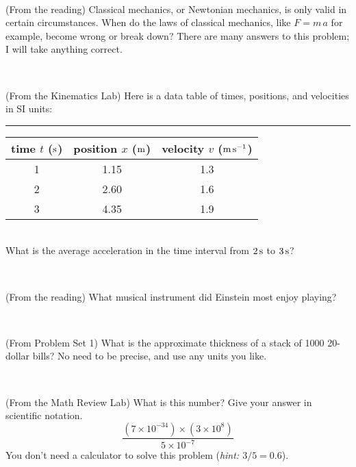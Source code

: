 \documentclass[12pt, letterpaper]{article}
\begin{document}
\vfill ~

\begin{problem} (From the reading)
Classical mechanics, or Newtonian mechanics, is only valid in certain
circumstances. When do the laws of classical mechanics, like $F =
m\,a$ for example, become wrong or break down? There are many answers
to this problem; I will take anything correct.
\end{problem}


\vfill ~


\clearpage


\begin{problem} (From the Kinematics Lab)
Here is a data table of times, positions, and velocities in SI units:\\
\rule{1.0in}{0pt}\begin{tabular}{c|c|c}
time $t$ ($\mathrm{s}$) & position $x$ ($\mathrm{m}$) & velocity $v$ ($\mathrm{m}\,\mathrm{s}^{-1}$) \\
\hline
1 & 1.15 & 1.3 \\
2 & 2.60 & 1.6 \\
3 & 4.35 & 1.9 \\
\hline
\end{tabular}\\
What is the average acceleration in the time interval from $2\,\mathrm{s}$ to $3\,\mathrm{s}$?
\end{problem}


\vfill ~

\begin{problem} (From the reading)
What musical instrument did Einstein most enjoy playing?
\end{problem}


\vfill ~

\begin{problem} (From Problem Set 1)
What is the approximate thickness of a stack of 1000 20-dollar bills?
No need to be precise, and use any units you like.
\end{problem}


\vfill ~

\begin{problem} (From the Math Review Lab)
What is this number? Give your answer in scientific notation.
$$
\frac{(7\times10^{-34})\times(3\times10^8)}{5\times10^{-7}}
$$
You don't need a calculator to solve this problem (\textit{hint: $3/5=0.6$}).
\end{problem}


\vfill ~


\cleardoublepage
\end{document}
